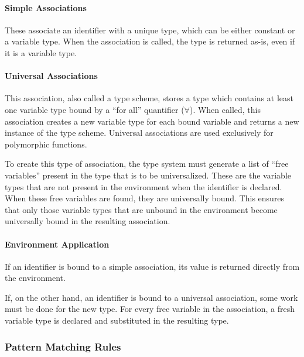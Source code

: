 \documentclass{article}
\begin{document}
\paragraph{Simple Associations}
These associate an identifier with a unique type, which can be either constant or a variable type.
When the association is called, the type is returned as-is, even if it is a variable type.

\paragraph{Universal Associations}
This association, also called a type scheme, stores a type which contains at least one variable type bound by a ``for all'' quantifier ($\forall$).
When called, this association creates a new variable type for each bound variable and returns a new instance of the type scheme.
Universal associations are used exclusively for polymorphic functions.

To create this type of association, the type system must generate a list of ``free variables'' present in the type that is to be universalized.
These are the variable types that are not present in the environment when the identifier is declared.
When these free variables are found, they are universally bound.
This ensures that only those variable types that are unbound in the environment become universally bound in the resulting association.

\paragraph{Environment Application}

If an identifier is bound to a simple association, its value is returned directly from the environment.

If, on the other hand, an identifier is bound to a universal association, some work must be done for the new  type.
For every free variable in the association, a fresh variable type is declared and substituted in the resulting type.

\subsubsection{Pattern Matching Rules}



\end{document}
